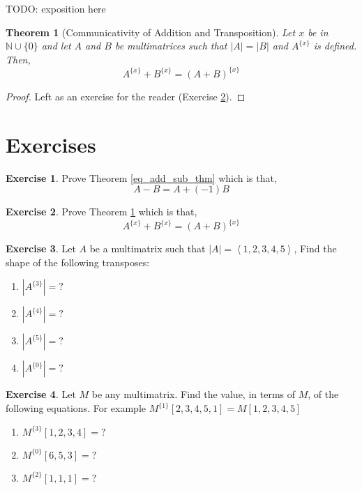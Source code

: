 \documentclass[12pt]{book}
\theoremstyle{plain}
\newtheorem{theorem}{Theorem}[chapter]
\theoremstyle{definition}
\newtheorem{exercise}{Exercise}[chapter]
\theoremstyle{ppart}
\theoremstyle{case}
\theoremstyle{solution}
\newcommand{\shape}[1]{\left|#1\right|}
\newcommand{\transpose}[2]{{#1}^{\{#2\}}}
\begin{document}
TODO: exposition here

\begin{theorem}[Communicativity of Addition and Transposition]
\label{com_add_tran_thm}
Let $x$ be in $\mathbb{N} \cup \{0\}$ and let $A$ and $B$ be
multimatrices such that $\shape{A} = \shape{B}$ and $\transpose{A}{x}$ is defined.
Then,
\[ \transpose{A}{x} + \transpose{B}{x} = \transpose{(A+B)}{x} \]
\end{theorem}
\begin{proof}
Left as an exercise for the reader (Exercise \ref{com_add_tran_ex}).
\end{proof}

\section{Exercises}

\begin{exercise}
\label{eq_add_sub_ex}
Prove Theorem \ref{eq_add_sub_thm} which is that,
\[ A - B = A + (-1)B \]
\end{exercise}

\begin{exercise}
\label{com_add_tran_ex}
Prove Theorem \ref{com_add_tran_thm} which is that,
\[ \transpose{A}{x} + \transpose{B}{x} = \transpose{(A+B)}{x} \]
\end{exercise}

\begin{exercise}
Let $A$ be a multimatrix such that $\shape{A} = \left<1,2,3,4,5\right>$,
Find the shape of the following transposes:
\begin{enumerate}
\item $\shape{\transpose{A}{3}} = ?$
\item $\shape{\transpose{A}{4}} = ?$
\item $\shape{\transpose{A}{5}} = ?$
\item $\shape{\transpose{A}{0}} = ?$
\end{enumerate}
\end{exercise}

\begin{exercise}
Let $M$ be any multimatrix.
Find the value, in terms of $M$, of the following equations.
For example $\transpose{M}{1}[2,3,4,5,1] = M[1,2,3,4,5]$
\begin{enumerate}
\item $\transpose{M}{3}[1,2,3,4] = ?$
\item $\transpose{M}{0}[6,5,3] = ?$
\item $\transpose{M}{2}[1,1,1] = ?$
\end{enumerate}
\end{exercise}
\end{document}
